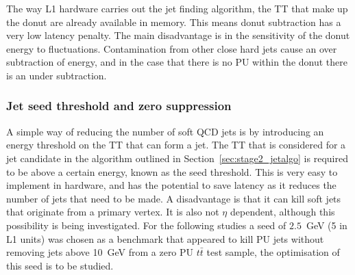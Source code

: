 The way L1 hardware carries out the jet finding algorithm, the TT that
make up the donut are already available in memory. This means donut
subtraction has a very low latency penalty. The main disadvantage is
in the sensitivity of the donut energy to fluctuations. Contamination
from other close hard jets cause an over subtraction of energy, and in
the case that there is no PU within the donut there is an under
subtraction. 

\subsubsection{Jet seed threshold and zero suppression}

A simple way of reducing the number of soft QCD jets is by introducing
an energy threshold on the TT that can form a jet. The TT that is
considered for a jet candidate in the algorithm outlined in
Section~\ref{sec:stage2_jetalgo} is required to be above a certain
energy, known as the seed threshold. This is very easy to implement in
hardware, and has the potential to save latency as it reduces the
number of jets that need to be made. A disadvantage is that it can
kill soft jets that originate from a primary vertex. It is also not
$\eta$ dependent, although this possibility is being investigated. For
the following studies a seed of $2.5$~GeV (5 in L1 units) was chosen
as a benchmark that appeared to kill PU jets without removing jets
above 10~GeV from a zero PU $t\bar{t}$ test sample, the optimisation
of this seed is to be studied. 



